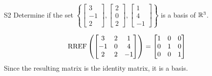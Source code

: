 \documentclass{sbgLAquiz}
\begin{document}
\begin{extract}\newpage\end{extract}
\begin{problem}{S2}
  Determine if the set \(\left\{
    \begin{bmatrix} 3 \\ -1 \\ 2 \end{bmatrix},
    \begin{bmatrix} 2 \\ 0 \\ 2 \end{bmatrix},
    \begin{bmatrix} 1 \\ 4 \\ -1 \end{bmatrix}
  \right\}\) is a basis of $\mathbb{R}^3$.
\end{problem}
\begin{solution}
  \[\operatorname{RREF}\left(
    \begin{bmatrix}
      3 & 2 & 1 \\
      -1 & 0 & 4 \\
      2 & 2 & -1
    \end{bmatrix} \right)= \begin{bmatrix}
      1 & 0 &0 \\
      0 & 1 & 0 \\
      0 & 0 & 1
    \end{bmatrix}
  \]
Since the resulting matrix is the identity matrix, it is a basis.
\end{solution}
\end{document}
